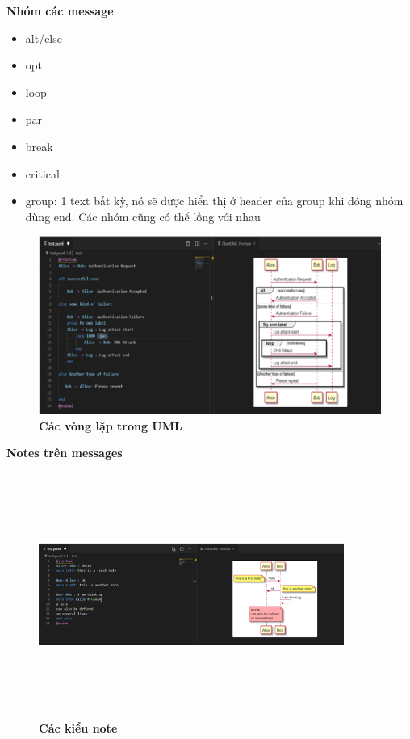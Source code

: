 \begin{enumerate}[a)]
\textbf{Nhóm các message}

\begin{adjustwidth}{2em}{}
  \begin{itemize}
    \item alt/else
    \item opt
    \item loop
    \item par
    \item break
    \item critical
    \item group: 1 text bất kỳ, nó sẽ được hiển thị ở header của group khi đóng nhóm dùng end. Các nhóm cũng có thể lồng với nhau
    
    
  \end{itemize}
  \end{adjustwidth}


  \begin{figure}[H]
    \centering
    \includegraphics[scale=0.5]{Images/appendix/plantuml_loops.png}
    \caption[Các vòng lặp trong UML]{\bfseries \fontsize{12pt}{0pt}
    \selectfont Các vòng lặp trong UML}
    \label{plantuml_object} %
  \end{figure}


  \textbf{Notes trên messages}
  
  \begin{figure}[H]
    \centering
    \includegraphics[width=10cm,height=8cm]{Images/appendix/plantuml_note.png}
    \caption[Các kiểu note]{\bfseries \fontsize{12pt}{0pt}
    \selectfont Các kiểu note}
    \label{plantuml_object} %
  \end{figure}



\end{enumerate}
